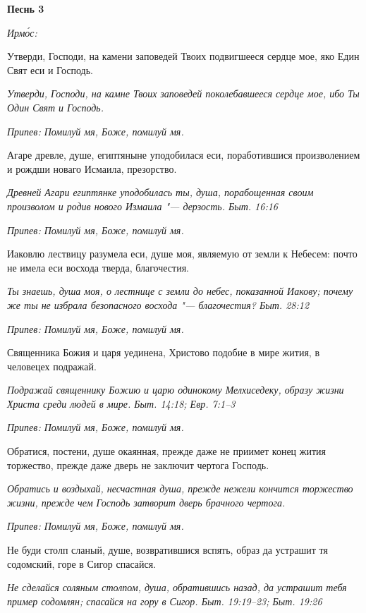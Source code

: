 \bfseries Песнь 3\normalfont{}


\itshape Ирмо́с:\normalfont{}


Утверди, Господи, на камени заповедей Твоих подвигшееся сердце мое, яко Един Свят еси и Господь.


\itshape Утверди, Господи, на камне Твоих заповедей поколебавшееся сердце мое, ибо Ты Один Свят и Господь.\normalfont{}


\itshape Припев:\normalfont{} Помилуй мя, Боже, помилуй мя.


Агаре древле, душе, египтяныне уподобилася еси, поработившися произволением и рождши новаго Исмаила, презорство.


\itshape Древней Агари египтянке уподобилась ты, душа, порабощенная своим произволом и родив нового Измаила "--- дерзость. Быт. 16:16\normalfont{}


\itshape Припев:\normalfont{} Помилуй мя, Боже, помилуй мя.


Иаковлю лествицу разумела еси, душе моя, являемую от земли к Небесем: почто не имела еси восхода тверда, благочестия.


\itshape Ты знаешь, душа моя, о лестнице с земли до небес, показанной Иакову; почему же ты не избрала безопасного восхода "--- благочестия? Быт. 28:12\normalfont{}


\itshape Припев:\normalfont{} Помилуй мя, Боже, помилуй мя.


Священника Божия и царя уединена, Христово подобие в мире жития, в человецех подражай.


\itshape Подражай священнику Божию и царю одинокому Мелхиседеку, образу жизни Христа среди людей в мире. Быт. 14:18; Евр. 7:1–3\normalfont{}


\itshape Припев:\normalfont{} Помилуй мя, Боже, помилуй мя.


Обратися, постени, душе окаянная, прежде даже не приимет конец жития торжество, прежде даже дверь не заключит чертога Господь.


\itshape Обратись и воздыхай, несчастная душа, прежде нежели кончится торжество жизни, прежде чем Господь затворит дверь брачного чертога.\normalfont{}


\itshape Припев:\normalfont{} Помилуй мя, Боже, помилуй мя.


Не буди столп сланый, душе, возвратившися вспять, образ да устрашит тя содомский, горе в Сигор спасайся.


\itshape Не сделайся соляным столпом, душа, обратившись назад, да устрашит тебя пример содомлян; спасайся на гору в Сигор. Быт. 19:19–23; Быт. 19:26\normalfont{}


